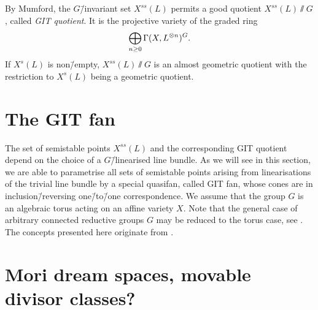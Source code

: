 \begin{remark}
	By Mumford, the $G$\=/invariant set $X^{ss}(L)$ permits a good quotient $X^{ss}(L)\sslash G$, called \emph{GIT quotient}. It is the projective variety of the graded ring
	$$\bigoplus_{n\geq 0} \Gamma(X,L^{\otimes n})^G.$$
	If  $X^{s}(L)$ is non\=/empty, $X^{ss}(L)\sslash G$ is an almost geometric quotient with the restriction to $X^{s}(L)$ being a geometric quotient.
\end{remark}

\section{The GIT fan}

The set of semistable points $X^{ss}(L)$ and the corresponding GIT quotient depend on the choice of a $G$\=/linearised line bundle. As we will see in this section, we are able to parametrise all sets of semistable points arising from linearisations of the trivial line bundle by a special quasifan, called GIT fan, whose cones are in inclusion\=/reversing one\=/to\=/one correspondence. We assume that the group $G$ is an algebraic torus acting on an affine variety $X$. Note that the general case of arbitrary connected reductive groups $G$ may be reduced to the torus case, see \cite[Lemma 3.3]{git_via_cox_rings}. The concepts presented here originate from \cite[chapter 2]{git_equivalence}.



\section{Mori dream spaces, movable divisor classes?}